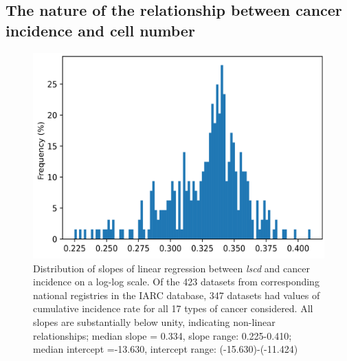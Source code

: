 \documentclass[10pt,twocolumn,twoside]{article}
\begin{document}
	\begin{refsection}
	\subsection{The nature of the relationship between cancer incidence and cell number}\label{S3 Text}
		\renewcommand{\thefigure}{S3.\arabic{figure}}
		\setcounter{figure}{0}

		\renewcommand{\thetable}{S3.\arabic{table}}
		\setcounter{table}{0}

		\begin{figure}[tbhp]
			\centering
			\includegraphics[width=\linewidth, keepaspectratio=true]{lin_slopes.png}
			\caption[Distribution of slopes]{Distribution of slopes of linear regression between \textit{lscd} and cancer incidence on a log-log scale. Of the 423 datasets from corresponding national registries in the IARC database, 347 datasets had values of cumulative incidence rate for all 17 types of cancer considered. All slopes are substantially below unity, indicating non-linear relationships; median slope = 0.334, slope range: 0.225-0.410; median intercept =-13.630, intercept range: (-15.630)-(-11.424)}
			\label{slopes}
		\end{figure}


\end{refsection}
\end{document}
